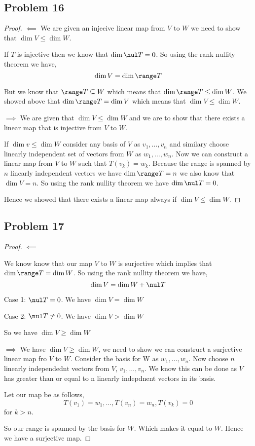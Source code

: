 \documentclass[a4paper]{report}
\begin{document}
\subsection*{Problem 16}
\begin{proof}
    $\impliedby$
    We are given an injecive linear map from $V$ to $W$ we need to show that $\dim V \le \dim W$.

    If $T$ is injective then we know that $\dim \nul T = 0$. So using the rank nullity theorem we have, 
    $$ \dim V = \dim \range T $$

    But we know that $\range T \subseteq W$ which means that  $\dim \range T \le \dim W$. We showed above that $\dim \range T = \dim V$ which means that $\dim V \le \dim W$.
 
    $\implies$
    We are given that $\dim V \le \dim W$ and we are to show that there exists a linear map that is injective from $V$ to $W$.

    If $\dim v \le \dim W$ consider any basis of $V$ as $v_1,\dots,v_n$ and similary choose linearly independent set of vectors from $W$ as $w_1,\dots,w_n$. Now we can construct a linear map from $V$ to $W$ such that $T(v_k) = w_k$. Because the range is spanned by $n$ linearly independent vectors we have $\dim \range T = n$ we also know that $\dim V = n$. So using the rank nullity theorem we have $\dim \nul T = 0$. 

    Hence we showed that there exists a linear map always if  $\dim V \le \dim W$.
\end{proof}

\subsection*{Problem 17}
\begin{proof}
    $\impliedby$

    We know know that our map $V$ to $W$ is surjective which implies that $\dim \range T = \dim W$. So using the rank nullity theorem we have,  
    $$ \dim V = \dim W + \nul T $$

    Case 1: $\nul T = 0$. We have $\dim V = \dim W$

    Case 2:  $\nul T \ne 0$. We have $\dim V > \dim W$

    So we have $\dim V \ge \dim W$

     $\implies$
     We have $\dim V \ge \dim W$, we need to show we can construct a surjective linear map fro  $V $ to $W$. Consider the basis for W as $w_1,\dots,w_n$. Now choose $n$ linearly independednt vectors from $V$,  $v_1,\dots,v_n$. We know this can be done as $V$ has greater than or equal to n linearly indepdnent vectors in its basis.

     Let our map be as follows, 
     $$ T(v_1) = w_1,\dots, T(v_n) = w_n, T(v_k) =0 $$  for $k > n$.

     So our range is spanned by  the basis for $W$. Which makes it equal to $W$. Hence we have a surjective map.

\end{proof}
\end{document}
